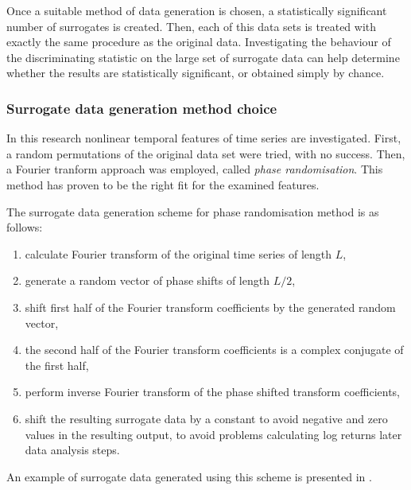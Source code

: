 Once a suitable method of data generation is chosen, a statistically significant number of surrogates is created.
Then, each of this data sets is treated with exactly the same procedure as the original data.
Investigating the behaviour of the discriminating statistic on the large set of surrogate data can help determine whether the results are statistically significant, or obtained simply by chance.

\newpage
\subsubsection{Surrogate data generation method choice} \label{sec:surrogate-method}
In this research nonlinear temporal features of time series are investigated.
First, a random permutations of the original data set were tried, with no success.
Then, a Fourier tranform approach was employed, called \emph{phase randomisation}.
This method has proven to be the right fit for the examined features.

The surrogate data generation scheme for phase randomisation method is as follows:
\begin{enumerate}
    \item calculate Fourier transform of the original time series of length $L$,
    \item generate a random vector of phase shifts of length $L/2$,
    \item shift first half of the Fourier transform coefficients by the generated random vector,
    \item the second half of the Fourier transform coefficients is a complex conjugate of the first half,
    \item perform inverse Fourier transform of the phase shifted transform coefficients,
    \item shift the resulting surrogate data by a constant to avoid negative and zero values in the resulting output, to avoid problems calculating log returns later data analysis steps.
\end{enumerate}

An example of surrogate data generated using this scheme is presented in .
